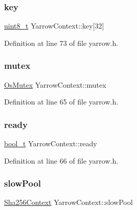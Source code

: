 \mbox{\label{structYarrowContext_af6ae1cbcaa5dd10f23acade23fb2b79c}} 
\subsubsection{\texorpdfstring{key}{key}}
{\footnotesize\ttfamily \hyperlink{stdint_8h_aba7bc1797add20fe3efdf37ced1182c5}{uint8\+\_\+t} Yarrow\+Context\+::key\mbox{[}32\mbox{]}}



Definition at line 73 of file yarrow.\+h.

\mbox{\label{structYarrowContext_ad640562fce2921008b8e1203a04b45a7}} 
\subsubsection{\texorpdfstring{mutex}{mutex}}
{\footnotesize\ttfamily \hyperlink{structOsMutex}{Os\+Mutex} Yarrow\+Context\+::mutex}



Definition at line 65 of file yarrow.\+h.

\mbox{\label{structYarrowContext_a69811dc5b1ae10c287a3f6c7752d7c21}} 
\subsubsection{\texorpdfstring{ready}{ready}}
{\footnotesize\ttfamily \hyperlink{compiler__port_8h_a812d16e5494522586b3784e55d479912}{bool\+\_\+t} Yarrow\+Context\+::ready}



Definition at line 66 of file yarrow.\+h.

\mbox{\label{structYarrowContext_afa35e962f4269b12f40dfc3f93ea64c4}} 
\subsubsection{\texorpdfstring{slow\+Pool}{slowPool}}
{\footnotesize\ttfamily \hyperlink{structSha256Context}{Sha256\+Context} Yarrow\+Context\+::slow\+Pool}




